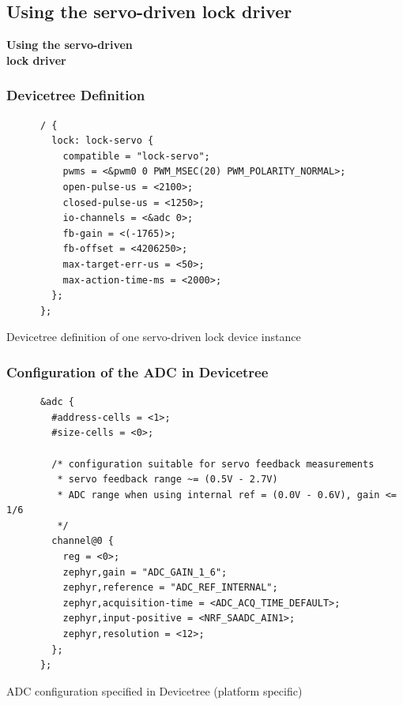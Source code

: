 \documentclass[handout]{beamer}
\begin{document}
\subsection{Using the servo-driven lock driver}

\begin{frame}
  \begin{center}
    \Large \textbf{Using the servo-driven\\lock driver}
  \end{center}
\end{frame}

\begin{frame}[fragile]
  \frametitle{Devicetree Definition}

  \begin{listing}[H]
    \begin{verbatim}
      / {
        lock: lock-servo {
          compatible = "lock-servo";
          pwms = <&pwm0 0 PWM_MSEC(20) PWM_POLARITY_NORMAL>;
          open-pulse-us = <2100>;
          closed-pulse-us = <1250>;
          io-channels = <&adc 0>;
          fb-gain = <(-1765)>;
          fb-offset = <4206250>;
          max-target-err-us = <50>;
          max-action-time-ms = <2000>;
        };
      };
    \end{verbatim}
    \caption{Devicetree definition of one servo-driven lock device instance}
  \end{listing}
\end{frame}

\begin{frame}[fragile]
  \frametitle{Configuration of the ADC in Devicetree}

  \begin{listing}[H]
    \begin{verbatim}
      &adc {
        #address-cells = <1>;
        #size-cells = <0>;

        /* configuration suitable for servo feedback measurements
         * servo feedback range ~= (0.5V - 2.7V)
         * ADC range when using internal ref = (0.0V - 0.6V), gain <= 1/6
         */
        channel@0 {
          reg = <0>;
          zephyr,gain = "ADC_GAIN_1_6";
          zephyr,reference = "ADC_REF_INTERNAL";
          zephyr,acquisition-time = <ADC_ACQ_TIME_DEFAULT>;
          zephyr,input-positive = <NRF_SAADC_AIN1>;
          zephyr,resolution = <12>;
        };
      };
    \end{verbatim}
    \caption{ADC configuration specified in Devicetree (platform specific)}
  \end{listing}
\end{frame}
\end{document}
